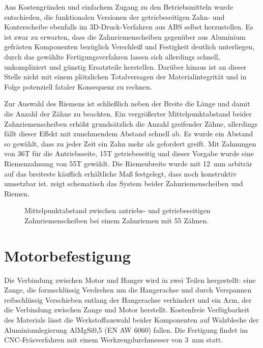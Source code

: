 		Aus Kostengründen und einfachem Zugang zu den Betriebsmitteln wurde entschieden, die funktionalen Versionen der getriebeseitigen Zahn- und Konterscheibe ebenfalls im 3D-Druck-Verfahren aus ABS selbst herzustellen.
		Es ist zwar zu erwarten, dass die Zahnriemenscheiben gegenüber aus Aluminium gefrästen Komponenten bezüglich Verschleiß und Festigkeit deutlich unterliegen, durch das gewählte Fertigungsverfahren lassen sich allerdings schnell, unkompliziert und günstig Ersatzteile herstellen.
		Darüber hinaus ist an dieser Stelle nicht mit einem plötzlichen Totalversagen der Materialintegrität und in Folge potenziell fataler Konsequenz zu rechnen.\par\medskip
		Zur Auswahl des Riemens ist schließlich neben der Breite die Länge und damit die Anzahl der Zähne zu beachten.
		Ein vergrößerter Mittelpunktabstand beider Zahnriemenscheiben erhöht grundsätzlich die Anzahl greifender Zähne, allerdings fällt dieser Effekt mit zunehmendem Abstand schnell ab.
		Es wurde ein Abstand so gewählt, dass zu jeder Zeit ein Zahn mehr als gefordert greift.
		Mit Zahnungen von 36T für die Antriebsseite, 15T getriebeseitig und dieser Vorgabe wurde eine Riemenzahnung von 55T gewählt.
		Die Riemenbreite wurde mit \qty{12}{\milli\metre} arbiträr auf das breiteste käuflich erhältliche Maß festgelegt, dass noch konstruktiv umsetzbar ist.
		 zeigt schematisch das System beider Zahnriemenscheiben und Riemen.
		\begin{figure}[h]
			\centering
			
			\caption[Mittelpunktabstand zwischen antriebs- und getriebeseitigen Zahnriemenscheiben]{Mittelpunktabstand zwischen antriebs- und getriebeseitigen Zahnriemenscheiben bei einem Zahnriemen mit 55 Zähnen.}%
			\label{fig:timing belt length}
		\end{figure}
	\section{Motorbefestigung}\label{sec:motorbefestigung}
		Die Verbindung zwischen Motor und Hanger wird in zwei Teilen hergestellt: eine Zange, die formschlüssig Verdrehen um die Hangerachse und durch Verspannen reibschlüssig Verschieben entlang der Hangerachse verhindert und ein Arm, der die Verbindung zwischen Zange und Motor herstellt.
		Kostenfreie Verfügbarkeit des Materials lässt die Werkstoffauswahl beider Komponenten auf Walzbleche der Aluminiumlegierung AlMgSi0,5 (EN AW 6060) fallen.
		Die Fertigung findet im CNC-Fräsverfahren mit einem Werkzeugdurchmesser von \qty{3}{\milli\metre} statt.

